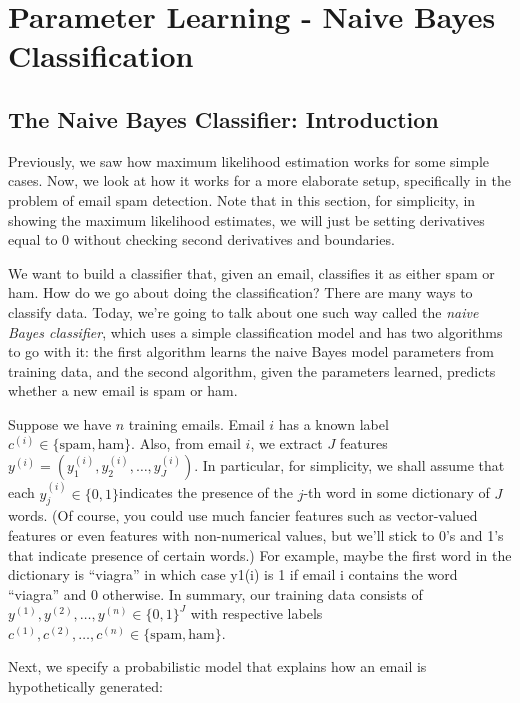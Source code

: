 
\graphicspath{ {images/naivebayes/} }

\section{Parameter Learning - Naive Bayes Classification}

\subsection{The Naive Bayes Classifier: Introduction}

Previously, we saw how maximum likelihood estimation works for some simple cases. Now, we look at how it works for a more elaborate setup, specifically in the problem of email spam detection. Note that in this section, for simplicity, in showing the maximum likelihood estimates, we will just be setting derivatives equal to 0 without checking second derivatives and boundaries.

We want to build a classifier that, given an email, classifies it as either spam or ham. How do we go about doing the classification? There are many ways to classify data. Today, we're going to talk about one such way called the \textit{naive Bayes classifier}, which uses a simple classification model and has two algorithms to go with it: the first algorithm learns the naive Bayes model parameters from training data, and the second algorithm, given the parameters learned, predicts whether a new email is spam or ham.

Suppose we have $n$ training emails. Email $i$ has a known label $c^{(i)}\in \{ \text {spam},\text {ham}\}$. Also, from email $i$, we extract $J$ features $y^{(i)}=(y_{1}^{(i)},y_{2}^{(i)},\dots ,y_{J}^{(i)})$. In particular, for simplicity, we shall assume that each $y_{j}^{(i)}\in \{ 0,1\}$indicates the presence of the $j$-th word in some dictionary of $J$ words. (Of course, you could use much fancier features such as vector-valued features or even features with non-numerical values, but we'll stick to 0's and 1's that indicate presence of certain words.) For example, maybe the first word in the dictionary is ``viagra'' in which case y1(i) is 1 if email i contains the word ``viagra'' and 0 otherwise. In summary, our training data consists of $y^{(1)},y^{(2)},\dots ,y^{(n)}\in \{ 0,1\} ^{J}$ with respective labels $c^{(1)},c^{(2)},\dots ,c^{(n)}\in \{ \text {spam},\text {ham}\}$.

Next, we specify a probabilistic model that explains how an email is hypothetically generated:

